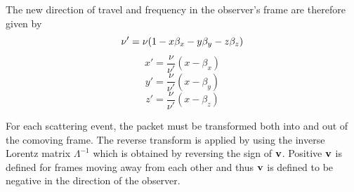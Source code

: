 \documentclass[useAMS,usenatbib,usegraphicx]{mnras}
\begin{document}
\noindent The new direction of travel and frequency in the observer's 
frame are therefore given by  
\begin{equation}
\nu'=\nu(1-x\beta_x-y\beta_y-z\beta_z) \\
\end{equation}
\[
x'=\frac{\nu}{\nu'}(x-\beta_x) 
\]
\[
y'=\frac{\nu}{\nu'}(x-\beta_y) 
\]
\[
z'=\frac{\nu}{\nu'}(x-\beta_z) 
\]

For each scattering event, the packet must be transformed both into and 
out of the comoving frame. The reverse transform is applied by using the 
inverse Lorentz matrix $\Lambda^{-1}$ which is obtained by reversing the 
sign of $\bf{v}$.  Positive $\bf{v}$ is defined for frames moving away 
from each other and thus $\bf{v}$ is defined to be negative in the 
direction of the observer.

\bsp

\label{lastpage}
\end{document}
